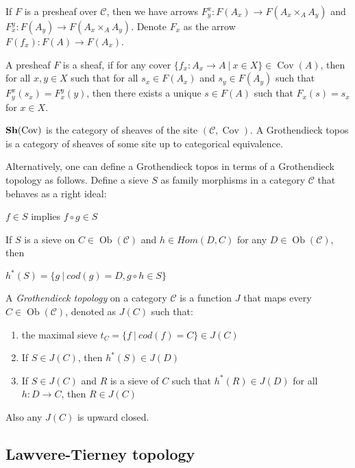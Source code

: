 \documentclass[a4paper]{article}
\theoremstyle{defin}
\theoremstyle{theorem}
\theoremstyle{claim}
\theoremstyle{prop}
\theoremstyle{lemma}
\theoremstyle{fact}
\theoremstyle{ex}
\theoremstyle{col}
\begin{document}

If $F$ is a presheaf over $\mathcal{C}$, then we have arrows $F^x_y : F(A_x) \to F(A_x \times_A A_y)$ and $F^y_x : F(A_y) \to F(A_x \times_A A_y)$. Denote $F_x$ as the arrow $F(f_x) : F(A) \to F(A_x)$.



A presheaf $F$ is a sheaf, if for any cover $\{ f_x : A_x \to A \: | \: x \in X \} \in \operatorname{Cov}(A)$, then for all $x, y \in X$ such that for all $s_x \in F(A_x)$ and $s_y \in F(A_y)$ such that $F^x_y(s_x) = F^y_x(y)$, then there exists a unique $s \in F(A)$ such that $F_x(s) = s_x$ for $x \in X$.

${\bf Sh}(\operatorname{Cov})$ is the category of sheaves of the site $(\mathcal{C}, \operatorname{Cov})$. A Grothendieck topos is a category of sheaves of some site up to categorical equivalence.

Alternatively, one can define a Grothendieck topos in terms of a Grothendieck topology as follows. Define a sieve $S$
as family morphisms in a category $\mathcal{C}$ that behaves as a right ideal:

\begin{center}
$f \in S$ implies $f \circ g \in S$
\end{center}

If $S$ is a sieve on $C \in \operatorname{Ob}(\mathcal{C})$ and $h \in Hom(D, C)$ for any $D \in \operatorname{Ob}(\mathcal{C})$, then
\begin{center}
$h^*(S) = \{ g \: | \: cod(g) = D, g \circ h \in S \}$
\end{center}

A \emph{Grothendieck topology} on a category $\mathcal{C}$ is a function $J$ that maps every $C \in \operatorname{Ob}(\mathcal{C})$, denoted as $J(C)$ such that:
\begin{enumerate}
\item the maximal sieve $t_C = \{ f \: | \: cod(f) = C\} \in J(C)$
\item If $S \in J(C)$, then $h^*(S) \in J(D)$
\item If $S \in J(C)$ and $R$ is a sieve of $C$ such that $h^*(R) \in J(D)$ for all $h : D \to C$, then $R \in J(C)$
\end{enumerate}
Also any $J(C)$ is upward closed.

\subsection{Lawvere-Tierney topology}
\end{document}
